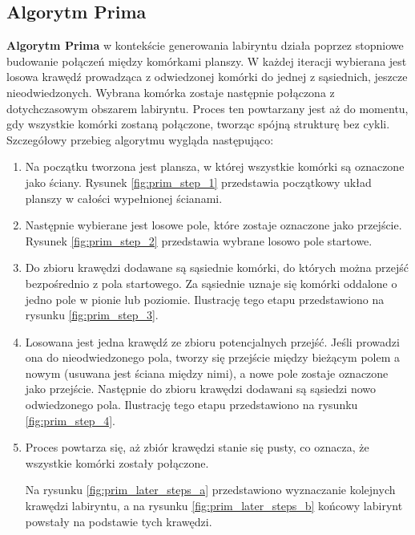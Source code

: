 \subsection{Algorytm Prima}

\textbf{Algorytm Prima} \cite{cormen2009} w kontekście generowania labiryntu działa poprzez stopniowe budowanie połączeń między komórkami planszy. W każdej iteracji wybierana jest losowa krawędź prowadząca z odwiedzonej komórki do jednej z sąsiednich, jeszcze nieodwiedzonych. Wybrana komórka zostaje następnie połączona z dotychczasowym obszarem labiryntu. Proces ten powtarzany jest aż do momentu, gdy wszystkie komórki zostaną połączone, tworząc spójną strukturę bez cykli. Szczegółowy przebieg algorytmu wygląda następująco:

\begin{enumerate}
    \item Na początku tworzona jest plansza, w której wszystkie komórki są oznaczone jako ściany. Rysunek \ref{fig:prim_step_1} przedstawia początkowy układ planszy w całości wypełnionej ścianami.
    
    

    \item Następnie wybierane jest losowe pole, które zostaje oznaczone jako przejście. Rysunek \ref{fig:prim_step_2} przedstawia wybrane losowo pole startowe.
    
    

    \item Do zbioru krawędzi dodawane są sąsiednie komórki, do których można przejść bezpośrednio z pola startowego. Za sąsiednie uznaje się komórki oddalone o jedno pole w pionie lub poziomie. Ilustrację tego etapu przedstawiono na rysunku \ref{fig:prim_step_3}.
    
    

    \item Losowana jest jedna krawędź ze zbioru potencjalnych przejść. Jeśli prowadzi ona do nieodwiedzonego pola, tworzy się przejście między bieżącym polem a nowym (usuwana jest ściana między nimi), a nowe pole zostaje oznaczone jako przejście. Następnie do zbioru krawędzi dodawani są sąsiedzi nowo odwiedzonego pola. Ilustrację tego etapu przedstawiono na rysunku \ref{fig:prim_step_4}.

    

    \item Proces powtarza się, aż zbiór krawędzi stanie się pusty, co oznacza, że wszystkie komórki zostały połączone.

    Na rysunku \ref{fig:prim_later_steps_a} przedstawiono wyznaczanie kolejnych krawędzi labiryntu, a na rysunku \ref{fig:prim_later_steps_b} końcowy labirynt powstały na podstawie tych krawędzi.
    
    
\end{enumerate}